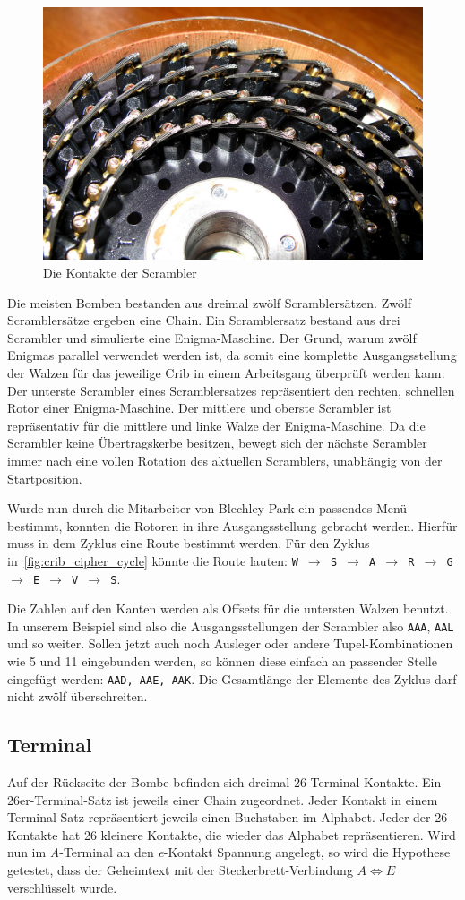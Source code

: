 \begin{figure}[htbp]
	\centering
	\includegraphics[width=0.4\linewidth]{WireBrushesOnBombeDrum}
	\caption{Die Kontakte der Scrambler\autocite{wiki:bombescrambler}}
	\label{fig:scrambler}
\end{figure} 


Die meisten Bomben bestanden aus dreimal zwölf Scramblersätzen.
Zwölf Scramblersätze ergeben eine \glqq Chain\grqq.
Ein Scramblersatz bestand aus drei Scrambler und simulierte eine Enigma-Maschine.
Der Grund, warum zwölf \glqq Enigmas\grqq{} parallel verwendet werden ist, da somit eine komplette Ausgangsstellung der Walzen für das jeweilige Crib in einem Arbeitsgang überprüft werden kann.
Der unterste Scrambler eines Scramblersatzes repräsentiert den rechten, schnellen Rotor einer Enigma-Maschine.
Der mittlere und oberste Scrambler ist repräsentativ für die mittlere und linke Walze der Enigma-Maschine.
Da die Scrambler keine Übertragskerbe besitzen, bewegt sich der nächste Scrambler immer nach eine vollen Rotation des aktuellen Scramblers, unabhängig von der Startposition. 

Wurde nun durch die Mitarbeiter von Blechley-Park ein passendes Menü bestimmt, konnten die Rotoren in ihre Ausgangsstellung gebracht werden. 
Hierfür muss in dem Zyklus eine \glqq Route\grqq{} bestimmt werden.
Für den Zyklus in~\cref{fig:crib_cipher_cycle} könnte die Route lauten: \texttt{W $\rightarrow$ S $\rightarrow$ A $\rightarrow$ R $\rightarrow$ G $\rightarrow$ E $\rightarrow$ V $\rightarrow$ S}.

Die Zahlen auf den Kanten werden als \glqq Offsets\grqq{} für die untersten Walzen benutzt.
In unserem Beispiel sind also die Ausgangsstellungen der Scrambler also \texttt{AAA}, \texttt{AAL} und so weiter.
Sollen jetzt auch noch Ausleger oder andere Tupel-Kombinationen wie 5 und 11 eingebunden werden, so können diese einfach an passender Stelle eingefügt werden: \texttt{AAD, AAE, AAK}.
Die Gesamtlänge der Elemente des Zyklus darf nicht zwölf überschreiten.

\subsection{Terminal}\label{subsec:terminal}
Auf der Rückseite der Bombe befinden sich dreimal 26 Terminal-Kontakte.
Ein 26er-Terminal-Satz ist jeweils einer Chain zugeordnet.
Jeder Kontakt in einem Terminal-Satz repräsentiert jeweils einen Buchstaben im Alphabet.
Jeder der 26 Kontakte hat 26 kleinere Kontakte, die wieder das Alphabet repräsentieren.
Wird nun im \emph{A}-Terminal an den \emph{e}-Kontakt Spannung angelegt, so wird die Hypothese getestet, dass der Geheimtext mit der Steckerbrett-Verbindung $A \Leftrightarrow E$ verschlüsselt wurde.

